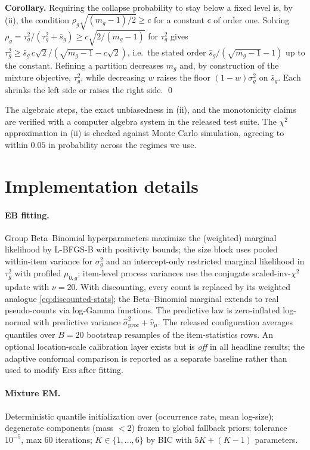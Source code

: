 \documentclass[twoside]{article}
\theoremstyle{definition}
\newcommand{\EBB}{\textsc{Ebb}}
\begin{document}
\textbf{Corollary.} Requiring the collapse probability to stay below a
fixed level is, by (ii), the condition $\rho_g\sqrt{(m_g-1)/2}\ge c$ for
a constant $c$ of order one. Solving
$\rho_g=\tau_g^2/(\tau_g^2+\bar s_g)\ge c\sqrt{2/(m_g-1)}$ for
$\tau_g^2$ gives
$\tau_g^2\ge\bar s_g\,c\sqrt{2}/(\sqrt{m_g-1}-c\sqrt2)$, i.e.\ the
stated order $\bar s_g/(\sqrt{m_g-1}-1)$ up to the constant. Refining a
partition decreases $m_g$ and, by construction of the mixture objective,
$\tau_g^2$, while decreasing $w$ raises the floor $(1-w)\sigma_g^2$ on
$\bar s_g$. Each shrinks the left side or raises the right side. \qed

The algebraic steps, the exact unbiasedness in (ii), and the monotonicity
claims are verified with a computer algebra system in
the released test suite. The $\chi^2$ approximation in (ii) is checked
against Monte Carlo simulation, agreeing to within $0.05$ in probability
across the regimes we use.

\section{Implementation details}\label{app:implementation}

\paragraph{EB fitting.} Group Beta--Binomial hyperparameters maximize the
(weighted) marginal likelihood by L-BFGS-B with positivity bounds; the
size block uses pooled within-item variance for $\sigma^2_g$ and an
intercept-only restricted marginal likelihood in $\tau^2_g$ with profiled
$\mu_{0,g}$; item-level process variances use the conjugate
scaled-inv-$\chi^2$ update with $\nu{=}20$. With discounting, every count
is replaced by its weighted analogue \eqref{eq:discounted-stats}; the
Beta--Binomial marginal extends to real pseudo-counts via log-Gamma
functions. The predictive law is zero-inflated log-normal with predictive
variance $\hat\sigma^2_{\mathrm{proc}}+\hat v_\mu$. The released
configuration averages quantiles over $B{=}20$ bootstrap resamples of the
item-statistics rows. An optional location-scale calibration layer exists
but is \emph{off} in all headline results; the adaptive conformal
comparison is reported as a separate baseline rather than used to modify
\EBB{} after fitting.

\paragraph{Mixture EM.} Deterministic quantile initialization over
(occurrence rate, mean log-size); degenerate components (mass $<2$)
frozen to global fallback priors; tolerance $10^{-5}$, max 60 iterations;
$K\in\{1,\dots,6\}$ by BIC with $5K+(K-1)$ parameters.
\end{document}
